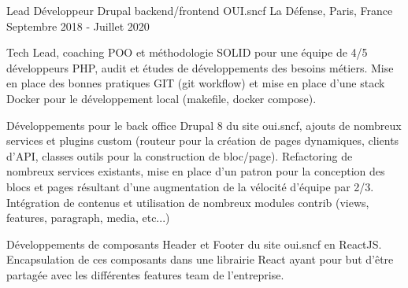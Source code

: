 \cventry
{Lead Développeur Drupal backend/frontend} %
{OUI.sncf} %
{La Défense, Paris, France} %
{Septembre 2018 - Juillet 2020} %
{
\begin{cvitems} %
    \item
    {
        Tech Lead, coaching POO et méthodologie SOLID pour une équipe de 4/5 développeurs PHP, audit et études
        de développements des besoins métiers. Mise en place des bonnes pratiques GIT (git workflow) et mise en place
        d'une stack Docker pour le développement local (makefile, docker compose).
    }
    \item
    {
        Développements pour le back office Drupal 8 du site oui.sncf, ajouts de nombreux services et plugins custom
        (routeur pour la création de pages dynamiques, clients d’API, classes outils pour la construction de bloc/page).
        Refactoring de nombreux services existants, mise en place d’un patron pour la conception des blocs et pages
        résultant d'une augmentation de la vélocité d’équipe par 2/3. Intégration de contenus et utilisation de nombreux
        modules contrib (views, features, paragraph, media, etc...)
    }
    \item
    {
        Développements de composants Header et Footer du site oui.sncf en ReactJS. Encapsulation de ces composants dans
        une librairie React ayant pour but d’être partagée avec les différentes features team de l’entreprise.
    }
\end{cvitems}
}
